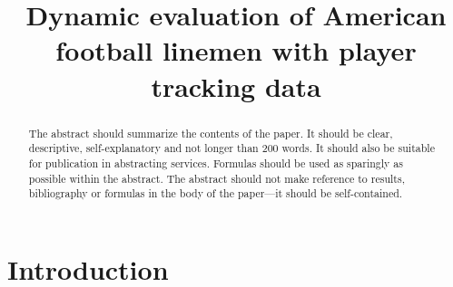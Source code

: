 \documentclass[aoas]{imsart}
\theoremstyle{plain}
\theoremstyle{remark}
\begin{document}
\begin{frontmatter}
\title{Dynamic evaluation of American football linemen with player tracking data}


\begin{abstract}
The abstract should summarize the contents of the paper.
It should be clear, descriptive, self-explanatory and not longer
than 200 words. It should also be suitable for publication in
abstracting services. Formulas should be used as sparingly as
possible within the abstract. The abstract should not make
reference to results, bibliography or formulas in the body
of the paper---it should be self-contained.
\end{abstract}

\begin{keyword}
\end{keyword}

\end{frontmatter}

\section{Introduction} \label{introduction}
\end{document}
